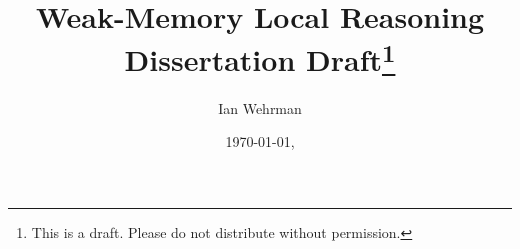 \documentclass[11pt]{report}
\begin{document}
 

	\author{Ian Wehrman} 
	\title{Weak-Memory Local Reasoning\\Dissertation Draft\footnote{This is a draft. Please do not distribute without permission.}} 
	\date{\today, \currenttime}
	\maketitle





\end{document}
